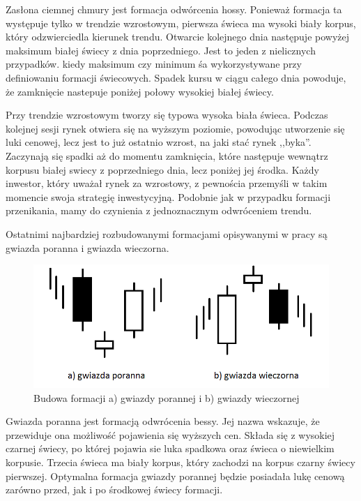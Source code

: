 \documentclass[pdflatex,11pt]{aghdpl}
\begin{document}
Zasłona ciemnej chmury jest formacja odwórcenia hossy. Ponieważ formacja ta występuje tylko w trendzie wzrostowym, pierwsza świeca ma wysoki biały korpus, który odzwierciedla kierunek trendu. Otwarcie kolejnego dnia następuje powyżej maksimum białej świecy z dnia poprzedniego. Jest to jeden z nielicznych przypadków. kiedy maksimum czy minimum śa wykorzystywane przy definiowaniu formacji świecowych. Spadek kursu w ciągu całego dnia powoduje, że zamknięcie nastepuje poniżej połowy wysokiej białej świecy. 

Przy trendzie wzrostowym tworzy się typowa wysoka biała świeca. Podczas kolejnej sesji rynek otwiera się na wyższym poziomie, powodując utworzenie się luki cenowej, lecz jest to już ostatnio wzrost, na jaki stać rynek ,,byka''. Zaczynają się spadki aż do momentu zamknięcia, które następuje wewnątrz korpusu białej swiecy z poprzedniego dnia, lecz poniżej jej środka. Każdy inwestor, który uważał rynek za wzrostowy, z pewnościa przemyśli w takim momencie swoja strategię inwestycyjną. Podobnie jak w przypadku formacji przenikania, mamy do czynienia z jednoznacznym odwróceniem trendu.
 
Ostatnimi najbardziej rozbudowanymi formacjami opisywanymi w pracy są gwiazda poranna i gwiazda wieczorna. 
\begin{figure}[ht]
\begin{center}
\includegraphics[width=12cm]{stars.png}
\caption{Budowa formacji a) gwiazdy porannej i b) gwiazdy wieczornej}
\label{gwiazdy}
\end{center}
\end{figure} 

Gwiazda poranna jest formacją odwrócenia bessy. Jej nazwa wskazuje, że przewiduje ona możliwość pojawienia się wyższych cen. Składa się z wysokiej czarnej świecy, po której pojawia sie luka spadkowa oraz świeca o niewielkim korpusie. Trzecia świeca ma biały korpus, który zachodzi na korpus czarny świecy pierwszej. Optymalna formacja gwiazdy porannej będzie posiadała lukę cenową zarówno przed, jak i po środkowej świecy formacji.
\end{document}
